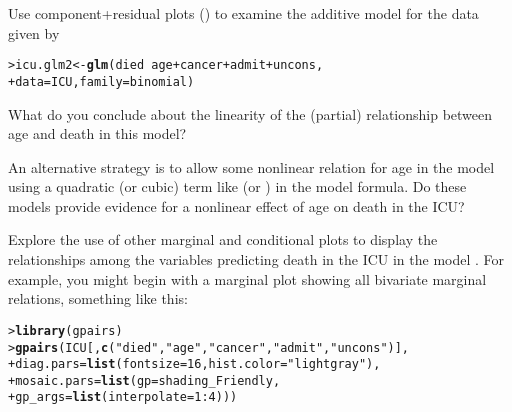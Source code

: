 \documentclass[11pt]{report}\usepackage[]{graphicx}\usepackage[]{color}
\makeatletter
\newcommand{\hlnum}[1]{\textcolor[rgb]{0.686,0.059,0.569}{#1}}%
\newcommand{\hlstr}[1]{\textcolor[rgb]{0.192,0.494,0.8}{#1}}%
\newcommand{\hlopt}[1]{\textcolor[rgb]{0,0,0}{#1}}%
\newcommand{\hlstd}[1]{\textcolor[rgb]{0.345,0.345,0.345}{#1}}%
\newcommand{\hlkwb}[1]{\textcolor[rgb]{0.69,0.353,0.396}{#1}}%
\newcommand{\hlkwc}[1]{\textcolor[rgb]{0.333,0.667,0.333}{#1}}%
\newcommand{\hlkwd}[1]{\textcolor[rgb]{0.737,0.353,0.396}{\textbf{#1}}}%
\newenvironment{kframe}{%
 \def\at@end@of@kframe{}%
 \ifinner\ifhmode%
  \def\at@end@of@kframe{\end{minipage}}%
  \begin{minipage}{\columnwidth}%
 \fi\fi%
 \def\FrameCommand##1{\hskip\@totalleftmargin \hskip-\fboxsep
 \colorbox{shadecolor}{##1}\hskip-\fboxsep
     \hskip-\linewidth \hskip-\@totalleftmargin \hskip\columnwidth}%
 \MakeFramed {\advance\hsize-\width
   \@totalleftmargin\z@ \linewidth\hsize
   \@setminipage}}%
 {\par\unskip\endMakeFramed%
 \at@end@of@kframe}
\newenvironment{knitrout}{}{} %
\renewenvironment{knitrout}{\small\renewcommand{\baselinestretch}{.85}}{} %
\makeatother
\begin{document}
\begin{Exercises}
\exercise Use component+residual plots () to examine the additive model for the  data
given by
\begin{knitrout}
\color{fgcolor}\begin{kframe}
\begin{alltt}
\hlstd{> }\hlstd{icu.glm2} \hlkwb{<-} \hlkwd{glm}\hlstd{(died} \hlopt{~} \hlstd{age} \hlopt{+} \hlstd{cancer}  \hlopt{+} \hlstd{admit} \hlopt{+} \hlstd{uncons,}
\hlstd{+ }                \hlkwc{data}\hlstd{=ICU,} \hlkwc{family}\hlstd{=binomial)}
\end{alltt}
\end{kframe}
\end{knitrout}
  \begin{enumerate*} 
    \item What do you conclude about the linearity of the 
    (partial) relationship between age and death in this model?
    \item An alternative strategy is to allow some nonlinear relation for
    age in the model using a quadratic (or cubic) term like  
    (or ) in the
    model formula. Do these models provide evidence for a nonlinear effect of age
    on death in the ICU?
  \end{enumerate*}
  

\exercise Explore the use of other marginal and conditional plots to display the relationships
among the variables predicting death in the ICU in the model .
For example, you might begin with a marginal  plot showing all bivariate
marginal relations, something like this:
\begin{knitrout}
\color{fgcolor}\begin{kframe}
\begin{alltt}
\hlstd{> }\hlkwd{library}\hlstd{(gpairs)}
\hlstd{> }\hlkwd{gpairs}\hlstd{(ICU[,}\hlkwd{c}\hlstd{(}\hlstr{"died"}\hlstd{,} \hlstr{"age"}\hlstd{,} \hlstr{"cancer"}\hlstd{,} \hlstr{"admit"}\hlstd{,} \hlstr{"uncons"}\hlstd{)],}
\hlstd{+ }  \hlkwc{diag.pars}\hlstd{=}\hlkwd{list}\hlstd{(}\hlkwc{fontsize}\hlstd{=}\hlnum{16}\hlstd{,} \hlkwc{hist.color}\hlstd{=}\hlstr{"lightgray"}\hlstd{),}
\hlstd{+ }  \hlkwc{mosaic.pars}\hlstd{=}\hlkwd{list}\hlstd{(}\hlkwc{gp}\hlstd{=shading_Friendly,}
\hlstd{+ }                   \hlkwc{gp_args}\hlstd{=}\hlkwd{list}\hlstd{(}\hlkwc{interpolate}\hlstd{=}\hlnum{1}\hlopt{:}\hlnum{4}\hlstd{)))}
\end{alltt}
\end{kframe}
\end{knitrout}



\end{Exercises}
\end{document}
